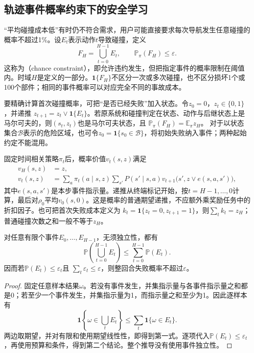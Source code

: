 \subsection{轨迹事件概率约束下的安全学习}
\label{sec:rl-trustworthy-chance}

“平均碰撞成本低”有时仍不符合需求，用户可能直接要求每次导航发生任意碰撞的概率不超过1\%。设$E_t$表示动作$t$导致碰撞，定义
\[
  F_H=\bigcup_{t=0}^{H-1}E_t,\qquad
  \mathbb P_\pi(F_H)\leq\varepsilon.
\]
这称为（chance constraint），即允许违约发生，但把指定事件的概率限制在阈值内。时域$H$是定义的一部分。$\mathbf1\{F_H\}$不区分一次或多次碰撞，也不区分损坏1个或100个部件；相同的事件概率可以对应完全不同的事故成本。

要精确计算首次碰撞概率，可把“是否已经失败”加入状态。令$z_0=0$，$z_t\in\{0,1\}$，并递推
$z_{t+1}=z_t\lor\mathbf1\{E_t\}$。若原系统和碰撞判定在状态、动作与后继状态上是马尔可夫的，则$(s_t,z_t)$也是马尔可夫状态，且
$\mathbb P_\pi(F_H)=\mathbb E_\pi z_H$。
对于以状态集合$\mathcal B$表示的危险区域，也可令$z_0=\mathbf1\{s_0\in\mathcal B\}$，将初始失败纳入事件；两种起始约定不能混用。

固定时间相关策略$\pi_t$后，概率价值$v_t(s,z)$满足
\begin{align}
  v_H(s,z)&=z,\nonumber\\
  v_t(s,z)&=\sum_a\pi_t(a\mid s,z)
       \sum_{s'}P(s'\mid s,a)
         v_{t+1}\bigl(s',z\lor e(s,a,s')\bigr),
  \label{eq:rl-trustworthy-probability-value}
\end{align}
其中$e(s,a,s')$是本步事件指示量。递推从终端标记开始，按$t=H-1,\ldots,0$计算，最后对$\rho_0$平均$v_0(s,0)$。这是概率的普通期望递推，不应额外乘奖励任务中的折扣因子。也可把首次失败成本定义为
$k_t=\mathbf1\{z_t=0,z_{t+1}=1\}$，则$\sum_tk_t=z_H$；普通碰撞次数之和一般不等于$z_H$。

\begin{theorem}[风险预算的并集界]
  \label{thm:rl-trustworthy-union-bound}
  对任意有限个事件$E_0,\ldots,E_{H-1}$，无须独立性，都有
  \[
    \mathbb P\left(\bigcup_{t=0}^{H-1}E_t\right)
      \leq\sum_{t=0}^{H-1}\mathbb P(E_t).
  \]
  因而若$\mathbb P(E_t)\leq\varepsilon_t$且
  $\sum_t\varepsilon_t\leq\varepsilon$，则整回合失败概率不超过$\varepsilon$。
\end{theorem}
\begin{proof}
  固定任意样本结果$\omega$。若没有事件发生，并集指示量与各事件指示量之和都是0；若至少一个事件发生，并集指示量为1，而指示量之和至少为1。因此逐样本有
  \[
    \mathbf1\left\{\omega\in\bigcup_tE_t\right\}
      \leq\sum_t\mathbf1\{\omega\in E_t\}.
  \]
  两边取期望，并对有限和使用期望线性性，即得到第一式。逐项代入$\mathbb P(E_t)\leq\varepsilon_t$，再使用预算和条件，得到第二个结论。整个推导没有使用事件独立性。
\end{proof}

